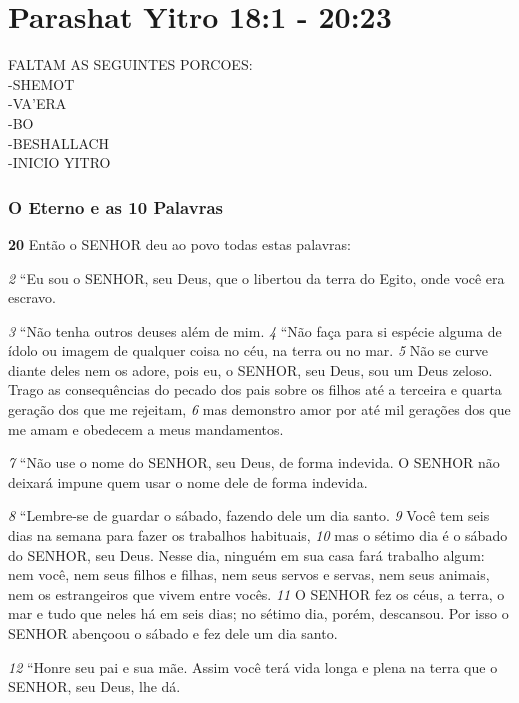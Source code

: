 \section*{Parashat Yitro 18:1 - 20:23}

\bigskip
FALTAM AS SEGUINTES PORCOES:\\
-SHEMOT\\
-VA'ERA\\
-BO\\
-BESHALLACH\\
-INICIO YITRO


   
\bigskip
\subsubsection*{O Eterno e as 10 Palavras}
\textbf{\large 20}
 Então o SENHOR deu ao povo todas estas palavras: 

\smallskip
\textit{\tiny 2} 
“Eu  sou o SENHOR, seu Deus, que o libertou da terra do Egito, onde você era escravo. 

\smallskip
\textit{\tiny 3} 
“Não tenha outros deuses além de mim. 
\textit{\tiny 4} 
“Não faça para si espécie alguma de ídolo ou imagem de qualquer coisa no céu, na terra ou no mar. 
\textit{\tiny 5} 
Não se curve diante deles nem os adore, pois eu, o SENHOR,
 seu Deus, sou um Deus zeloso. Trago as consequências do pecado dos pais sobre os filhos até a terceira e quarta geração dos que me rejeitam, 
\textit{\tiny 6} 
mas demonstro amor por até mil gerações dos que me amam e obedecem a meus
 mandamentos. 

\smallskip
\textit{\tiny 7} 
“Não use o nome do SENHOR, seu Deus, de forma indevida. O SENHOR não deixará impune quem usar o nome dele de forma indevida. 

\smallskip
\textit{\tiny 8} 
“Lembre-se de guardar o sábado, fazendo dele um dia santo. 
\textit{\tiny 9} 
Você tem seis dias
 na semana para fazer os trabalhos habituais, 
\textit{\tiny 10}
mas o sétimo dia é o sábado do
 SENHOR, seu Deus. Nesse dia, ninguém em sua casa fará trabalho algum: nem
 você, nem seus filhos e filhas, nem seus servos e servas, nem seus animais, nem os estrangeiros que vivem entre vocês. 
\textit{\tiny 11}
O SENHOR fez os céus, a terra, o mar e
 tudo que neles há em seis dias; no sétimo dia, porém, descansou. Por isso o SENHOR abençoou o sábado e fez dele um dia santo.

\smallskip
\textit{\tiny 12}
“Honre seu pai e sua mãe. Assim você terá vida longa e plena na terra que o SENHOR, seu Deus, lhe dá.

